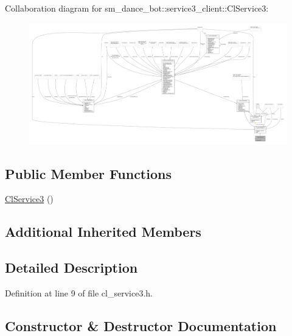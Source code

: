 Collaboration diagram for sm\+\_\+dance\+\_\+bot\+:\+:service3\+\_\+client\+:\+:Cl\+Service3\+:
\nopagebreak
\begin{figure}[H]
\begin{center}
\leavevmode
\includegraphics[width=350pt]{classsm__dance__bot_1_1service3__client_1_1ClService3__coll__graph}
\end{center}
\end{figure}
\subsection*{Public Member Functions}
\begin{DoxyCompactItemize}
\item 
\hyperlink{classsm__dance__bot_1_1service3__client_1_1ClService3_a772d6b3e98ffca50b63fdf100ab12929}{Cl\+Service3} ()
\end{DoxyCompactItemize}
\subsection*{Additional Inherited Members}


\subsection{Detailed Description}


Definition at line 9 of file cl\+\_\+service3.\+h.



\subsection{Constructor \& Destructor Documentation}
